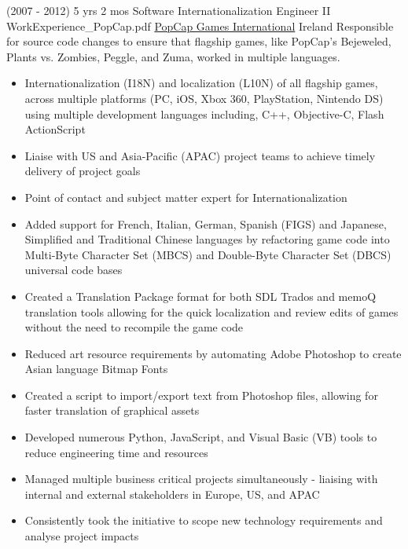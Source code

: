 
\begin{twenty}
\twentyitem
  {(2007 - 2012) 5 yrs 2 mos}
  {Software Internationalization Engineer II}
  {WorkExperience_PopCap.pdf}
  {\href{https://www.popcap.com/}{PopCap Games International}}
  {Ireland}
  {Responsible for source code changes to ensure that flagship games, like PopCap's Bejeweled, Plants vs. Zombies, Peggle, and Zuma, worked in multiple languages.}
  {\begin{itemize}
    \item Internationalization (I18N) and localization (L10N) of all flagship games, across multiple platforms (PC, iOS, Xbox 360, PlayStation, Nintendo DS) using multiple development languages including, C++, Objective-C, Flash ActionScript
    \item Liaise with US and Asia-Pacific (APAC) project teams to achieve timely delivery of project goals
    \item Point of contact and subject matter expert for Internationalization
  \end{itemize}}
  {\begin{itemize}
    \item Added support for French, Italian, German, Spanish (FIGS) and Japanese, Simplified and Traditional Chinese languages by refactoring game code into Multi-Byte Character Set (MBCS) and Double-Byte Character Set (DBCS) universal code bases
    \item Created a Translation Package format for both SDL Trados and memoQ translation tools allowing for the quick localization and review edits of games without the need to recompile the game code
    \item Reduced art resource requirements by automating Adobe Photoshop to create Asian language Bitmap Fonts
    \item Created a script to import/export text from Photoshop files, allowing for faster translation of graphical assets
    \item Developed numerous Python, JavaScript, and Visual Basic (VB) tools to reduce engineering time and resources
    \item Managed multiple business critical projects simultaneously - liaising with internal and external stakeholders in Europe, US, and APAC
    \item Consistently took the initiative to scope new technology requirements and analyse project impacts
  \end{itemize}}
\end{twenty}

